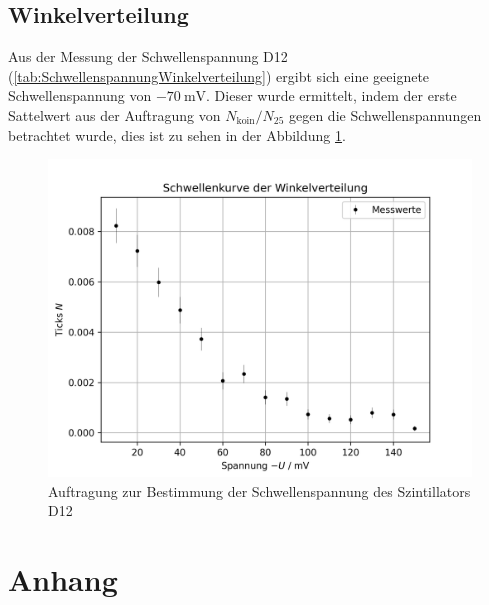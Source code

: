 \documentclass{article}
\begin{document}
\subsection{Winkelverteilung}
Aus der Messung der Schwellenspannung D12 (\ref{tab:SchwellenspannungWinkelverteilung}) ergibt sich eine geeignete Schwellenspannung von $\SI{-70}{\milli\volt}$.
Dieser wurde ermittelt, indem der erste Sattelwert aus der Auftragung von $N_\text{koin}/N_{25}$ gegen die Schwellenspannungen betrachtet wurde, 
dies ist zu sehen in der Abbildung \ref{fig:SchwellenspannungWinkelverteilung}.
\begin{figure}[H]
    \centering
    \includegraphics[width=1\textwidth]{figures/Schwellenspannung_Winkelverteilung.png}
    \caption{Auftragung zur Bestimmung der Schwellenspannung des Szintillators D12}
    \label{fig:SchwellenspannungWinkelverteilung}
\end{figure}
\section{Anhang}
\end{document}
